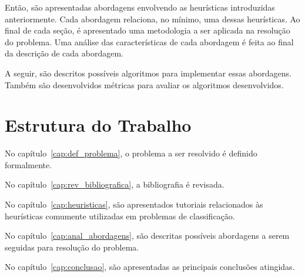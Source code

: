 Então, são apresentadas abordagens envolvendo as heurísticas introduzidas
anteriormente. Cada abordagem relaciona, no mínimo, uma dessas heurísticas.
Ao final de cada seção, é apresentado uma metodologia a ser aplicada
na resolução do problema. Uma análise das características de cada abordagem
é feita ao final da descrição de cada abordagem.

A seguir, são descritos possíveis algoritmos para implementar essas abordagens. Também são
desenvolvidos métricas para avaliar os algoritmos desenvolvidos.


\section{Estrutura do Trabalho}

No capítulo~\ref{cap:def_problema}, o problema a ser resolvido é definido formalmente.

No capítulo~\ref{cap:rev_bibliografica}, a bibliografia é revisada.

No capítulo~\ref{cap:heuristicas}, são apresentados tutoriais relacionados às
heurísticas comumente utilizadas em problemas de classificação.

No capítulo~\ref{cap:anal_abordagens}, são descritas possíveis abordagens a serem
seguidas para resolução do problema.

No capítulo~\ref{cap:conclusao}, são apresentadas as principais conclusões atingidas.
